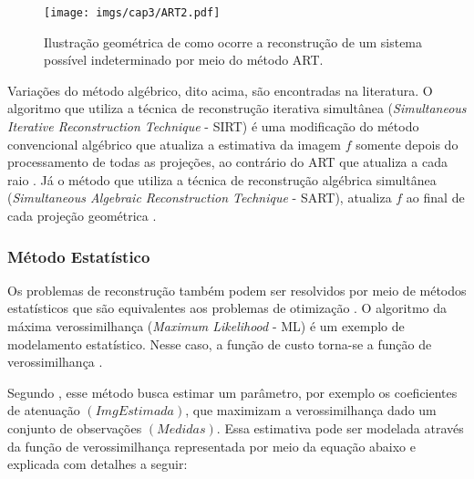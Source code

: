{{\begin{figure}[H]
	\caption{Ilustração geométrica de como ocorre a reconstrução de um sistema possível indeterminado por meio do método \acs{ART}.}
	\begin{center}
		\texttt{[image: imgs/cap3/ART2.pdf]}
	\end{center}
	\label{fig:imgCap3ARTIndeterminado}
\end{figure}

Variações do método algébrico, dito acima, são encontradas na literatura. O algoritmo que utiliza a técnica de reconstrução iterativa simultânea (\textit{Simultaneous Iterative Reconstruction Technique} - \acs{SIRT}) é uma modificação do método convencional algébrico que atualiza a estimativa da imagem $f$ somente depois do processamento de todas as projeções, ao contrário do \acs{ART} que atualiza a cada raio \cite{zhang2006comparative,yang2012numerical,zeng2010medical}. Já o método que utiliza a técnica de reconstrução algébrica simultânea (\textit{Simultaneous Algebraic Reconstruction Technique} - \acs{SART}), atualiza $f$ ao final de cada projeção geométrica \cite{zhang2006comparative,levakhina2014three,yang2012numerical}.   


\subsubsection{Método Estatístico}\label{MétodoEstatístico}

Os problemas de reconstrução também podem ser resolvidos por meio de métodos estatísticos que são equivalentes aos problemas de otimização \cite[p. 79]{levakhina2014three}. O algoritmo da máxima verossimilhança (\textit{Maximum Likelihood} - \acs{ML}) é um exemplo de modelamento estatístico. Nesse caso, a função de custo torna-se a função de verossimilhança \cite[p. 77]{levakhina2014three}.

Segundo , esse método busca estimar um parâmetro, por exemplo os coeficientes de atenuação $(ImgEstimada)$, que maximizam a verossimilhança dado um conjunto de observações $(Medidas)$. Essa estimativa pode ser modelada através da função de verossimilhança representada por meio da equação abaixo e explicada com detalhes a seguir:

}}
